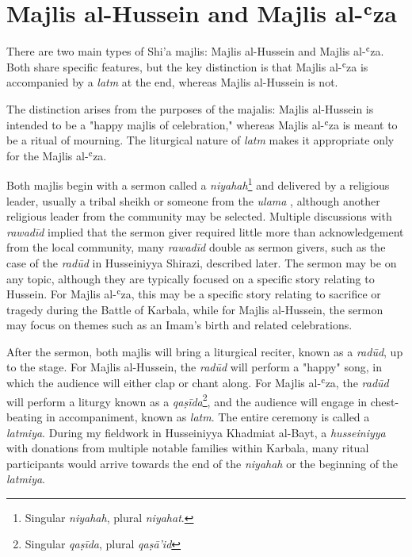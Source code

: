 \section{Majlis al-Hussein and Majlis al-ʿza}
There are two main types of Shi'a majlis: Majlis al-Hussein and Majlis al-ʿza. Both share specific features, but the key distinction is that Majlis al-ʿza is accompanied by a \emph{latm} at the end, whereas Majlis al-Hussein is not.

The distinction arises from the purposes of the majalis: Majlis al-Hussein is intended to be a "happy majlis of celebration," \cite{al-husseini_interview_2022} whereas Majlis al-ʿza is meant to be a ritual of mourning. The liturgical nature of \emph{latm} makes it appropriate only for the Majlis al-ʿza.

Both majlis begin with a sermon called a \emph{niyahah}\footnote{Singular \emph{niyahah}, plural \emph{niyahat}.} and delivered by a religious leader, usually a tribal sheikh or someone from the \emph{ulama} \cite{hamdan_development_2012}, although another religious leader from the community may be selected. Multiple discussions with \emph{rawadīd} implied that the sermon giver required little more than acknowledgement from the local community, many \emph{rawadīd} double as sermon givers, such as the case of the \emph{radūd} in Husseiniyya Shirazi, described later. The sermon may be on any topic, although they are typically focused on a specific story relating to Hussein. For Majlis al-ʿza, this may be a specific story relating to sacrifice or tragedy during the Battle of Karbala, while for Majlis al-Hussein, the sermon may focus on themes such as an Imam's birth and related celebrations.

After the sermon, both majlis will bring a liturgical reciter, known as a \emph{radūd}, up to the stage. For Majlis al-Hussein, the \emph{radūd} will perform a "happy" song, in which the audience will either clap or chant along. For Majlis al-ʿza, the \emph{radūd} will perform a liturgy known as a \emph{qaṣīda}\footnote{Singular \emph{qaṣīda}, plural \emph{qaṣā’id}}, and the audience will engage in chest-beating in accompaniment, known as \emph{latm}. The entire ceremony is called a \emph{latmiya}. During my fieldwork in Husseiniyya Khadmiat al-Bayt, a \emph{husseiniyya} with donations from multiple notable families within Karbala, many ritual participants would arrive towards the end of the \emph{niyahah} or the beginning of the \emph{latmiya}.

